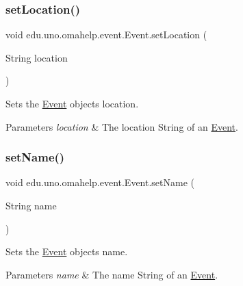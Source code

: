 \subsubsection{\texorpdfstring{set\+Location()}{setLocation()}}
{\footnotesize\ttfamily void edu.\+uno.\+omahelp.\+event.\+Event.\+set\+Location (\begin{DoxyParamCaption}\item[{String}]{location }\end{DoxyParamCaption})}

Sets the \mbox{\hyperlink{classedu_1_1uno_1_1omahelp_1_1event_1_1_event}{Event}} object\textquotesingle{}s location.


\begin{DoxyParams}{Parameters}
{\em location} & The location String of an \mbox{\hyperlink{classedu_1_1uno_1_1omahelp_1_1event_1_1_event}{Event}}. \\
\hline
\end{DoxyParams}
\mbox{\label{classedu_1_1uno_1_1omahelp_1_1event_1_1_event_a9b823a7d3e19509e9c354a36ac977133}} 
\subsubsection{\texorpdfstring{set\+Name()}{setName()}}
{\footnotesize\ttfamily void edu.\+uno.\+omahelp.\+event.\+Event.\+set\+Name (\begin{DoxyParamCaption}\item[{String}]{name }\end{DoxyParamCaption})}

Sets the \mbox{\hyperlink{classedu_1_1uno_1_1omahelp_1_1event_1_1_event}{Event}} object\textquotesingle{}s name.


\begin{DoxyParams}{Parameters}
{\em name} & The name String of an \mbox{\hyperlink{classedu_1_1uno_1_1omahelp_1_1event_1_1_event}{Event}}. \\
\hline
\end{DoxyParams}
\mbox{\label{classedu_1_1uno_1_1omahelp_1_1event_1_1_event_ac1cdaef50c5e0716853bb312e6be7299}} 
